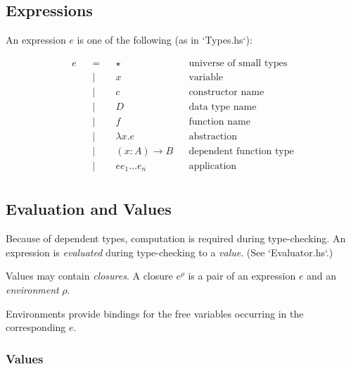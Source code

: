 \documentclass[acmsmall]{acmart}
\begin{document}
\subsection{Expressions}

An expression $e$ is one of the following (as in `Types.hs`):

\begin{equation*}
  \begin{aligned}
    e &  & = &  & \star           &  & \textrm{universe of small types} \\
      &  & | &  & x               &  & \textrm{variable}                \\
      &  & | &  & c               &  & \textrm{constructor name}        \\
      &  & | &  & D               &  & \textrm{data type name}          \\
      &  & | &  & f               &  & \textrm{function name}           \\
      &  & | &  & \lambda x.e     &  & \textrm{abstraction}             \\
      &  & | &  & (x:A) \to B     &  & \textrm{dependent function type} \\
      &  & | &  & e e_1 \dots e_n &  & \textrm{application}             \\
  \end{aligned}
\end{equation*}

\subsection{Evaluation and Values}

Because of dependent types, computation is required during type-checking. An
expression is \textit{evaluated} during type-checking to a \textit{value}. (See `Evaluator.hs`.)

Values may contain \textit{closures}. A closure \textbf{$e^{\rho}$} is a pair of an expression $e$ and an
\textit{environment} \textbf{$\rho$}.

Environments provide bindings for the free variables occurring in the
corresponding $e$.

\subsubsection{Values}
\end{document}
